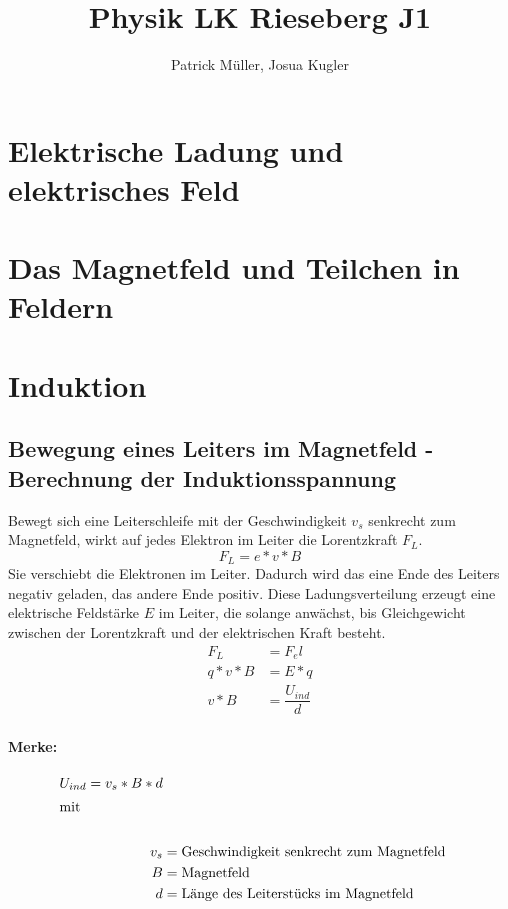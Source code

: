 \documentclass[12 pt]{article}
\title{Physik LK Rieseberg J1}
\author{Patrick M\"uller, Josua Kugler}
\numberwithin{equation}{section}
\begin{document}
	\maketitle
	\tableofcontents
	\pagebreak
	\section{Elektrische Ladung und elektrisches Feld}
	
	\section{Das Magnetfeld und Teilchen in Feldern}
	
	\section{Induktion}
	\subsection{Bewegung eines Leiters im Magnetfeld - Berechnung der Induktionsspannung}
	Bewegt sich eine Leiterschleife mit der Geschwindigkeit $v_s$ senkrecht zum Magnetfeld, wirkt auf jedes Elektron im Leiter die Lorentzkraft $F_L$.
	\begin{equation}
		F_L=e*v*B
	\end{equation}
	Sie verschiebt die Elektronen im Leiter. Dadurch wird das eine Ende des Leiters negativ geladen, das andere Ende positiv. Diese Ladungsverteilung erzeugt eine elektrische Feldstärke $E$ im Leiter, die solange anwächst, bis Gleichgewicht zwischen der Lorentzkraft und der elektrischen Kraft besteht.
		\begin{align}
		F_L&=F_el\nonumber\\
		q*v*B&=E*q\nonumber\\
		v*B&=\dfrac{U_{ind}}{d}\nonumber
		\end{align}
		\paragraph{Merke:}
		\begin{align}
		U_{ind}=v_s*B*d\\
		\intertext{mit}\nonumber\\
		v_s&=\text{Geschwindigkeit senkrecht zum Magnetfeld}\nonumber\\
		B&=\text{Magnetfeld}\nonumber\\
		d&=\text{Länge des Leiterstücks im Magnetfeld}\nonumber
		\end{align}	
\end{document}
